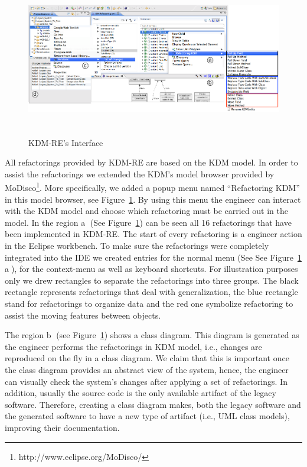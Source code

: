 \begin{figure}[!ht]
\centering
  \includegraphics[width=15cm, height=6.8cm]{figure/ScreenShot_tool}
\caption{KDM-RE's Interface}
\label{fig:interface}
\end{figure}

All refactorings provided by KDM-RE are based on the KDM model. 
In order to assist the refactorings we extended the KDM's model browser provided by MoDisco\footnote{http://www.eclipse.org/MoDisco/}. 
More specifically, we added a popup menu named ``Refactoring KDM'' in this model browser, see Figure~\ref{fig:interface}.
By using this menu the engineer can interact with the KDM model and choose which refactoring must be carried out in the model.
In the region \textcircled{a} (See Figure~\ref{fig:interface}) can be seen all 16 refactorings that have been implemented in KDM-RE. 
The start of every refactoring is a engineer action in the Eclipse workbench.
To make sure the refactorings were completely integrated into the IDE we created entries for the normal menu (See See Figure~\ref{fig:interface} \textcircled{a}), for the context-menu as well as keyboard shortcuts.
For illustration purposes only we drew rectangles to separate the refactorings into three groups. 
The black rectangle represents refactorings that deal with generalization, the blue rectangle stand for refactorings to organize data and the red one symbolize refactoring to assist the moving features between objects.

The region \textcircled{b} (see Figure~\ref{fig:interface}) shows a class diagram. This diagram is generated as the engineer performs the refactorings in KDM model, i.e., changes are reproduced on the fly in a class diagram.
We claim that this is important once the class diagram provides an abstract view of the system, hence, the engineer can visually check the system's changes after applying a set of refactorings. 
In addition, usually the source code is the only available artifact of the legacy software. 
Therefore, creating a class diagram makes, both the legacy software and the generated software to have a new type of artifact (i.e., UML class models), improving their documentation.

